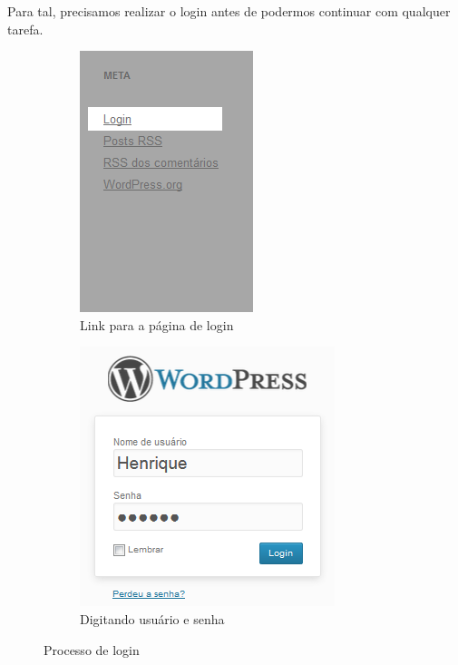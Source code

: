 \documentclass[12pt,onecolumn]{article}
\begin{document}
		Para tal, precisamos realizar o login antes de podermos continuar com qualquer
		tarefa.
		\begin{figure}[H]
			\begin{subfigure}{.4\textwidth}
				\centering
				\includegraphics{login1.png}
				\caption{Link para a página de login}
			\end{subfigure}
			\begin{subfigure}{.4\textwidth}
				\centering
				\includegraphics{login2.png}
				\caption{Digitando usuário e senha}
			\end{subfigure}
			\caption{Processo de login}
		\end{figure}
	
	
\end{document}
